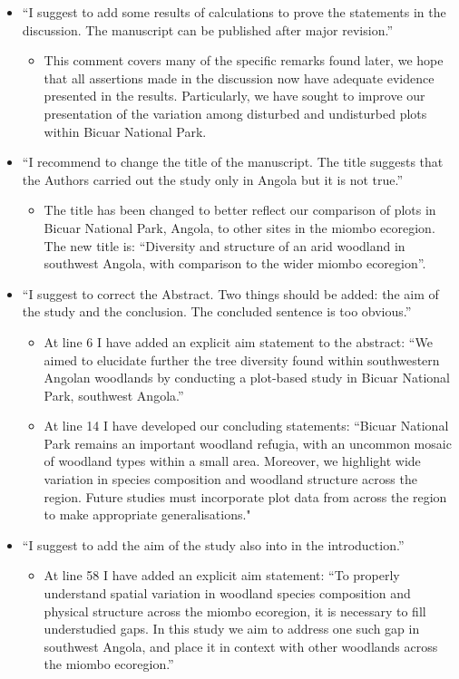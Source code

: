 \documentclass[a4paper]{letter}
\begin{document}
\begin{letter}{}
\begin{itemize}
	\item{``I suggest to add some results of calculations to prove the statements in the discussion.  The manuscript can be published after major revision.''}
		\begin{itemize}
			\item{This comment covers many of the specific remarks found later, we hope that all assertions made in the discussion now have adequate evidence presented in the results. Particularly, we have sought to improve our presentation of the variation among disturbed and undisturbed plots within Bicuar National Park.}
		\end{itemize}
	\item{``I recommend to change the title of the manuscript. The title suggests that the Authors carried out the study only in Angola but it is not true.''}
		\begin{itemize}
			\item{The title has been changed to better reflect our comparison of plots in Bicuar National Park, Angola, to other sites in the miombo ecoregion. The new title is: ``Diversity and structure of an arid woodland in southwest Angola, with comparison to the wider miombo ecoregion''.}
		\end{itemize}
	\item{``I suggest to correct the Abstract. Two things should be added: the aim of the study and the conclusion. The concluded sentence is too obvious.''}
		\begin{itemize}
			\item{At line 6 I have added an explicit aim statement to the abstract: ``We aimed to elucidate further the tree diversity found within southwestern Angolan woodlands by conducting a plot-based study in Bicuar National Park, southwest Angola.''}
			\item{At line 14 I have developed our concluding statements: ``Bicuar National Park remains an important woodland refugia, with an uncommon mosaic of woodland types within a small area. Moreover, we highlight wide variation in species composition and woodland structure across the region. Future studies must incorporate plot data from across the region to make appropriate generalisations."}
		\end{itemize}
	\item{``I suggest to add the aim of the study also into in the introduction.''}
		\begin{itemize}
			\item{At line 58 I have added an explicit aim statement: ``To properly understand spatial variation in woodland species composition and physical structure across the miombo ecoregion, it is necessary to fill understudied gaps. In this study we aim to address one such gap in southwest Angola, and place it in context with other woodlands across the miombo ecoregion.''}

\end{itemize}
\end{itemize}
\end{letter}
\end{document}
